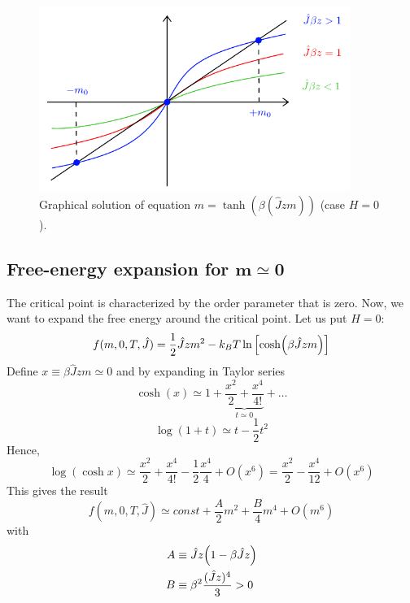 \documentclass[../main/main.tex]{subfiles}
\begin{document}
\begin{figure}[h!]
\centering
\includegraphics[width=0.9\textwidth]{../lessons/11_image/1.pdf}
\caption{\label{fig:11_1} Graphical solution of equation \(m =  \tanh (\beta (\hat{J}z m )) \) (case \(H=0\)).}
\end{figure}


\subsection{Free-energy expansion for \( \pmb{m \simeq 0} \) }
The critical point is characterized by the order parameter that is zero. Now, we want to expand the free energy around the critical point. Let us put \( H=0 \):
\begin{equation}
  f(m,0,T,\hat{J} ) = \frac{1}{2}\hat{J}zm^2 -k_BT \ln{\qty[\cosh(\beta \hat{J}zm )]}
\end{equation}
Define \( x \equiv \beta \hat{J} z m \simeq 0  \) and by expanding in Taylor series
\begin{equation*}
  \cosh (x) \simeq 1 + \underbrace{\frac{x^2}{2} + \frac{x^4}{4!}}_{t \simeq 0}  + \dots
\end{equation*}
\begin{equation*}
  \log{(1+t)} \simeq t - \frac{1}{2}t^2
\end{equation*}
Hence,
\begin{equation*}
  \log{(\cosh x)} \simeq \frac{x^2}{2} + \frac{x^4}{4!} - \frac{1}{2} \frac{x^4}{4}+O(x^6)
  = \frac{x^2}{2} - \frac{x^4}{12}+O(x^6)
\end{equation*}
This gives the result
\begin{equation}
  f(m,0,T,\hat{J} ) \simeq  const + \frac{A}{2} m^2 + \frac{B}{4} m^4 + O (m^6)
\end{equation}
with
\begin{subequations}
\begin{align}
   A & \equiv  \hat{J} z \qty(1- \beta \hat{J} z) \\
    B & \equiv  \beta ^2 \frac{(\hat{J}z )^4}{3} > 0
\end{align}
\end{subequations}
\end{document}
